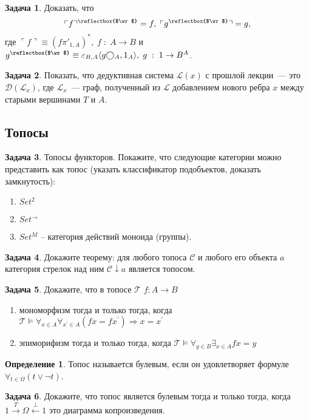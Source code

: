 \documentclass[10pt]{article}
\theoremstyle{definition}
\newtheorem{Def}{Определение}
\newtheorem{Pm}{Задача}[subsection]
\DeclareRobustCommand{\ArrowOf}{\text{\reflectbox{$\wr$}}}
\begin{document}
\begin{Pm}
    Доказать, что
    $$
        \ulcorner f \urcorner^\ArrowOf = f,\; \ulcorner g^\ArrowOf \urcorner = g\text{,}
    $$
    где $\ulcorner f \urcorner \equiv (f\pi'_{1,A})^*,\; f\; :\; A \rightarrow B$ и $g^\ArrowOf \equiv \varepsilon_{B,A} \langle g \bigcirc_A, 1_A \rangle,\; g\; :\; 1 \rightarrow B^A$.
\end{Pm}

\begin{Pm}
    Показать, что дедуктивная система $\mathscr{L}(x)$ с прошлой лекции~--- это $\mathscr{D}(\mathscr{L}_x)$, где $\mathscr{L}_x$~--- граф, полученный из $\mathscr{L}$ добавлением нового ребра $x$ между старыми вершинами $T$ и $A$.
\end{Pm}

\subsection{Топосы}
\begin{Pm}
    Топосы функторов. Покажите, что следующие категории можно представить как топос (указать классификатор подобъектов, доказать замкнутость):
    \begin{enumerate}
        \item $Set^2$
        \item $Set^\rightarrow$
        \item $Set^M$ -- категория действий моноида (группы).
    \end{enumerate}
\end{Pm}

\begin{Pm}
    Докажите теорему:
    для любого топоса $\mathcal{C}$ и любого его объекта $a$ категория стрелок над ним $\mathcal{C}\downarrow a$ является топосом.
\end{Pm}

\begin{Pm}
    Докажите, что в топосе $\mathcal{T}$ $f:A \to B$
    \begin{enumerate}
        \item мономорфизм тогда и только тогда, когда $\mathcal{T} \vDash \forall_{x\in A}\forall_{x^\prime \in A} (f x = f x^\prime) \Rightarrow x = x^\prime$
        \item эпиморифизм тогда и только тогда, когда $\mathcal{T} \vDash \forall_{y\in B}\exists_{x\in A}f x = y$
    \end{enumerate}
\end{Pm}

\begin{Def}
    Топос называется булевым, если он удовлетворяет формуле $\forall_{t\in \Omega}(t \lor \neg t)$.
\end{Def}
\begin{Pm}
    Докажите, что топос является булевым тогда и только тогда, когда
    $1 \overset{T}{\to} \Omega \overset{\bot}{\leftarrow} 1$ это диаграмма копроизведения.
\end{Pm}
\end{document}
